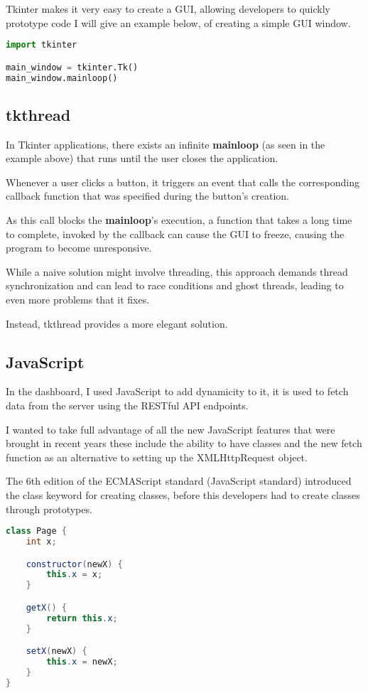 Tkinter makes it very easy to create a GUI, allowing developers to quickly prototype code
I will give an example below,
of creating a simple GUI window.

\begin{lstlisting}[language=Python]
import tkinter

main_window = tkinter.Tk()
main_window.mainloop()
\end{lstlisting}

\subsection{tkthread}
In Tkinter applications, there exists an infinite \textbf{mainloop}
(as seen in the example above)
that runs until the user closes the application.

Whenever a user clicks a button,
it triggers an event that calls the corresponding callback function
that was specified during the button's creation.

As this call blocks the \textbf{mainloop}'s execution,
a function that takes a long time to complete,
invoked by the callback can cause the GUI to freeze,
causing the program to become unresponsive.

While a naive solution might involve threading,
this approach demands thread synchronization and can lead to race conditions
and ghost threads, leading to even more problems that it fixes.

Instead, tkthread provides a more elegant solution.

\subsection{JavaScript}
In the dashboard, I used JavaScript to add dynamicity to it,
it is used to fetch data from the server using the RESTful API endpoints.

I wanted to take full advantage of all the new JavaScript features that were brought in
recent years these include the ability to have classes and the new fetch function as an alternative to setting up the XMLHttpRequest object.

The 6th edition of the ECMAScript standard \cite{ES6} (JavaScript standard) 
introduced the class keyword for creating classes,
before this developers had to create classes through prototypes.
\begin{lstlisting}[language=Java]
class Page {
    int x;

    constructor(newX) {
        this.x = x;
    }

    getX() {
        return this.x;
    }

    setX(newX) {
        this.x = newX;
    }
}
\end{lstlisting}

